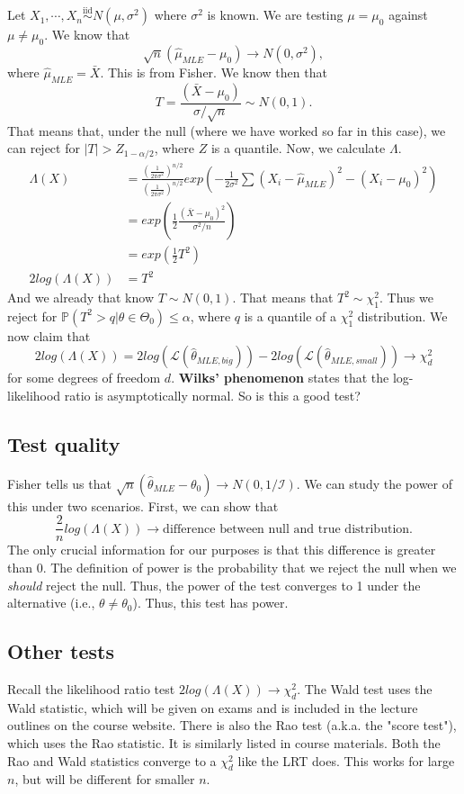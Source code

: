 \documentclass[titlepage, 12pt, leqno]{article}
\begin{document}
Let $X_{1}, \cdots , X_{n} \overset{\mathrm{iid}}{\sim} N(\mu, \sigma^{2})$
where $\sigma^{2}$ is known. We are testing $\mu=\mu_{0}$ against 
$\mu\ne\mu_{0}$. We know that
\[
\sqrt{n}(\hat \mu_{MLE} - \mu_{0}) \rightarrow N(0, \sigma^{2}),
\]
where $\hat \mu_{MLE} = \bar X$. This is from Fisher. We know then that
\[
T = \frac{(\bar X - \mu_{0})}{\sigma/\sqrt{n}} \sim N(0,1).
\]
That means that, under the null (where we have worked so far in this case),
we can reject for $|T|>Z_{1 - \alpha/2}$, where $Z$ is a quantile. Now, we
calculate $\Lambda$.
\begin{align*}
    \Lambda(X)
    &= \frac{\left(\frac{1}{2\pi\sigma^{2}}\right)^{n/2}}{\left(
        \frac{1}{2\pi\sigma^{2}}\right)^{n/2}}
        exp\left(-\frac{1}{2\sigma^{2}}\sum (X_{i}-\hat \mu_{MLE})^{2} -
        (X_{i}- \mu_{0})^{2}\right)\\
    &= exp\left(\frac{1}{2}\frac{(\bar X-\mu_{0})^{2}}{\sigma^{2}/n}\right)\\
    &= exp\left(\frac{1}{2}T^{2}\right) \\
    2log(\Lambda(X)) &= T^{2} 
\end{align*}
And we already that know $T \sim N(0,1)$. That means that $T^{2} \sim \chi^{2}
_{1}$. Thus we reject for $\mathbb{P}(T^{2}>q | \theta \in \Theta_{0}) \le
\alpha$, where $q$ is a quantile of a $\chi^{2}_{1}$ distribution. We now claim
that 
\[
2log(\Lambda(X)) = 2log(\mathcal{L}(\hat \theta_{MLE, big})) -
2log(\mathcal{L}(\hat \theta_{MLE, small})) \rightarrow \chi^{2}_{d}
\]
for some degrees of freedom $d$. \textbf{Wilks' phenomenon} states that the
log-likelihood ratio is asymptotically normal. So is this a good test?

\subsection{Test quality}
Fisher tells us that $\sqrt{n}(\hat \theta_{MLE} - \theta_{0})
\rightarrow N(0, 1/\mathcal{I})$. We can study the power of this under two
scenarios. First, we can show that 
\[
\frac{2}{n}log(\Lambda(X)) \rightarrow \text{difference between null and true 
distribution.}
\]
The only crucial information for our purposes is that this difference is
greater than 0. The definition of power is the probability that we reject the
null when we \textit{should} reject the null. Thus, the power of the test
converges to 1 under the alternative (i.e., $\theta\ne\theta_{0}$). Thus, this
test has power.

\subsection{Other tests}
Recall the likelihood ratio test $2log(\Lambda(X)) \rightarrow \chi^{2}_{d}$.
The Wald test uses the Wald statistic, which will be given
on exams and is included in the lecture outlines on the course website. There
is also the Rao test (a.k.a. the "score test"), which uses the Rao statistic.
It is similarly listed in course materials. Both the Rao and Wald statistics
converge to a $\chi^{2}_{d}$ like the LRT does. This works for large $n$, but
will be different for smaller $n$.
\end{document}
